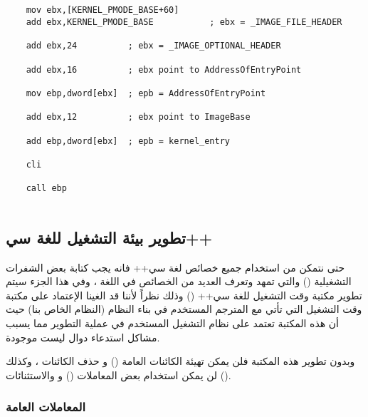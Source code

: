 \documentclass[document.tex]{subfiles}
\begin{document}
\begin{english}

\lstset{numberstyle=\tiny,numbersep=5pt,tabsize=2,extendedchars=true,breaklines=true,frame=b,showspaces=false, showtabs=false,xleftmargin=10pt,framexleftmargin=10pt,framexrightmargin=5pt,framexbottommargin=4pt,showstringspaces=false,language=[x86masm]Assembler}


\begin{lstlisting}[label=newdelete,caption=Global new/delete operator]

		
	mov ebx,[KERNEL_PMODE_BASE+60]
	add ebx,KERNEL_PMODE_BASE			; ebx = _IMAGE_FILE_HEADER
		
	add ebx,24			; ebx = _IMAGE_OPTIONAL_HEADER
		
	add ebx,16			; ebx point to AddressOfEntryPoint
		
	mov ebp,dword[ebx]	; epb = AddressOfEntryPoint
		
	add ebx,12			; ebx point to ImageBase
		
	add ebp,dword[ebx]	; epb = kernel_entry
		
	cli
		
	call ebp
		

\end{lstlisting}
\end{english}


\subsection{تطوير بيئة التشغيل للغة سي++}
حتى نتمكن من استخدام جميع خصائص لغة سي++  فانه يجب كتابة بعض الشفرات التشغيلية () والتي تمهد وتعرف العديد من الخصائص في اللغة ، وفي هذا الجزء سيتم تطوير مكتبة وقت التشغيل للغة سي++ ()  وذلك نظراً لأننا قد الغينا الإعتماد على مكتبة وقت التشغيل التي تأتي مع المترجم المستخدم في بناء النظام (النظام الخاص بنا) حيث أن هذه المكتبة  تعتمد على نظام التشغيل المستخدم في عملية التطوير مما يسبب مشاكل استدعاء دوال ليست موجودة.

وبدون تطوير هذه المكتبة فلن يمكن تهيئة الكائنات العامة ()  و حذف الكائنات ، وكذلك لن يمكن استخدام بعض المعاملات () و  والاستثنائات ().


\subsubsection{المعاملات العامة }
\end{document}
